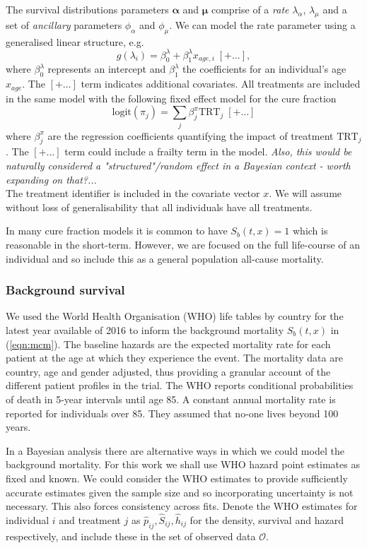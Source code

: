 \documentclass[AMA,STIX1COL]{WileyNJD-v2}
\begin{document}
The survival distributions parameters $\bm\alpha$ and $\bm\mu$ comprise of a {\it rate} $\lambda_{\alpha}$, $\lambda_{\mu}$ and a set of {\it ancillary} parameters $\phi_{\alpha}$ and $\phi_{\mu}$.
We can model the rate parameter using a generalised linear structure, e.g.
$$
g(\lambda_i) = \beta^{\lambda}_0 + \beta^{\lambda}_1 x_{age, i} \; [+ \ldots ],
$$
where $\beta^{\lambda}_0$ represents an intercept and $\beta^{\lambda}_1$ the coefficients for an individual's age $x_{age}$.
The $[+ \ldots]$ term indicates additional covariates.
All treatments are included in the same model with the following fixed effect model for the cure fraction
\begin{equation}
\label{eqn:pi_regn}
\mbox{logit}(\pi_j) = \sum_j \beta^{\pi}_j \mbox{TRT}_j \;[+ \ldots]
\end{equation}
\noindent
where $\beta^{\pi}_j$ are the regression coefficients quantifying the impact of treatment $\mbox{TRT}_j$.
The $[+ \ldots]$ term could include a frailty term in the model.
{\it Also, this would be naturally considered a "structured"/random effect in a Bayesian context - worth expanding on that?...}\\
The treatment identifier is included in the covariate vector $x$.
We will assume without loss of generalisability that all individuals have all treatments.

In many cure fraction models it is common to have $S_b(t, x) = 1$ which is reasonable in the short-term.
However, we are focused on the full life-course of an individual and so include this as a general population all-cause mortality.

%
\subsubsection{Background survival}
We used the World Health Organisation (WHO) life tables by country for the latest year available of 2016
\cite{wholifetables} to inform the background mortality $S_b(t, x)$ in (\ref{eqn:mcm}).
The baseline hazards are the expected mortality rate for each
patient at the age at which they experience the event. The mortality
data are country, age and gender adjusted, thus providing a granular account of
the different patient profiles in the trial.
The WHO reports conditional probabilities of death in 5-year intervals until age 85.
A constant annual mortality rate is reported for individuals over 85.
They assumed that no-one lives beyond 100 years.

In a Bayesian analysis there are alternative ways in which we could
model the background mortality.
For this work we shall use WHO hazard point estimates as fixed and known.
We could consider the WHO estimates to provide sufficiently accurate estimates
given the sample size and so incorporating uncertainty is not necessary.
This also forces consistency across fits.
Denote the WHO estimates for individual $i$ and treatment $j$ as
$\hat{p}_{ij}, \hat{S}_{ij}, \hat{h}_{ij}$ for the density,
survival and hazard respectively, and include these in the set of observed
data $\mathcal{O}$.
\end{document}
